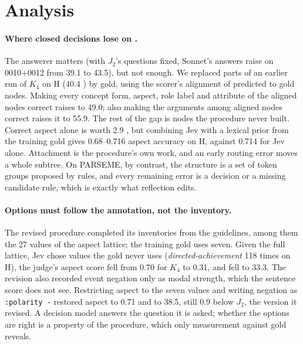 \section{Analysis}
\label{sec:analysis}

\paragraph{Where closed decisions lose on \umr.}
The answerer matters (with $J_2$'s questions fixed, Sonnet's answers raise \F on 0010+0012 from 39.1 to 43.5), but not enough. We replaced parts of an earlier run of $K_4$ on H (40.4 \F) by gold, using the scorer's alignment of predicted to gold nodes. Making every concept form, aspect, role label and attribute of the aligned nodes correct raises \F to 49.0; also making the arguments among aligned nodes correct raises it to 55.9. The rest of the gap is nodes the procedure never built. Correct aspect alone is worth 2.9 \F, but combining Jev with a lexical prior from the training gold gives 0.68--0.716 aspect accuracy on H, against 0.714 for Jev alone. Attachment is the procedure's own work, and an early routing error moves a whole subtree. On PARSEME, by contrast, the structure is a set of token groups proposed by rules, and every remaining error is a decision or a missing candidate rule, which is exactly what reflection edits.

\paragraph{Options must follow the annotation, not the inventory.}
The revised \umr procedure completed its inventories from the guidelines, among them the 27 values of the aspect lattice; the training gold uses seven. Given the full lattice, Jev chose values the gold never uses (\emph{directed-achievement} 118 times on H), the judge's aspect score fell from 0.70 for $K_4$ to 0.31, and \F fell to 33.3. The revision also recorded event negation only as modal strength, which the sentence score does not see. Restricting aspect to the seven values and writing negation as \texttt{:polarity -} restored aspect to 0.71 and \F to 38.5, still 0.9 below $J_2$, the version it revised. A decision model answers the question it is asked; whether the options are right is a property of the procedure, which only measurement against gold reveals.

